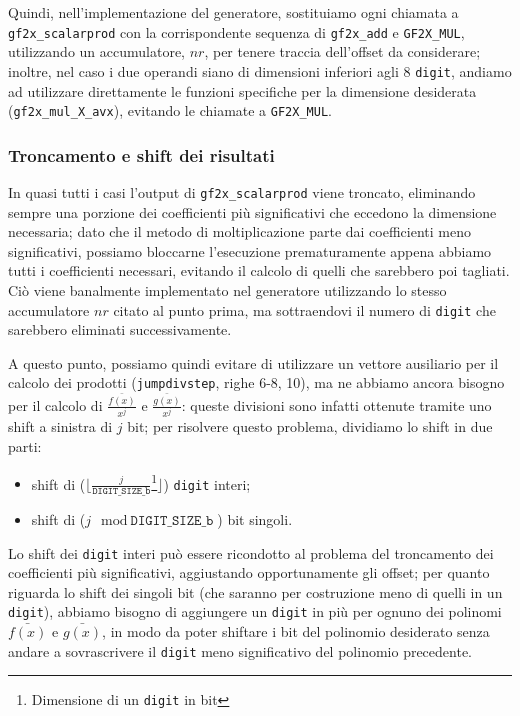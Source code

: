 Quindi, nell'implementazione del generatore, sostituiamo ogni chiamata a \texttt{gf2x\_scalarprod} con la corrispondente sequenza di \texttt{gf2x\_add} e \texttt{GF2X\_MUL},
utilizzando un accumulatore, $nr$, per tenere traccia dell'offset da considerare;
inoltre, nel caso i due operandi siano di dimensioni inferiori agli 8 \texttt{digit}, andiamo ad utilizzare direttamente le funzioni specifiche per la dimensione
desiderata (\texttt{gf2x\_mul\_X\_avx}), evitando le chiamate a \texttt{GF2X\_MUL}.

\subsubsection*{Troncamento e shift dei risultati}
In quasi tutti i casi l'output di \texttt{gf2x\_scalarprod} viene troncato, eliminando sempre una porzione dei coefficienti più significativi che eccedono la dimensione necessaria; dato che il
metodo di moltiplicazione parte dai coefficienti meno significativi, possiamo bloccarne l'esecuzione prematuramente appena abbiamo tutti i coefficienti
necessari, evitando il calcolo di quelli che sarebbero poi tagliati. Ciò viene banalmente implementato  nel generatore utilizzando lo stesso accumulatore
$nr$ citato al punto prima, ma sottraendovi il numero di \texttt{digit} che sarebbero eliminati successivamente. 

A questo punto, possiamo quindi evitare di utilizzare un vettore ausiliario per il calcolo dei prodotti (\texttt{jumpdivstep}, righe 6-8, 10), ma ne abbiamo ancora bisogno
per il calcolo di $\frac{\bar{f(x)}}{x^{j}}$ e $\frac{\bar{g(x)}}{x^{j}}$: queste divisioni sono infatti ottenute tramite uno shift a sinistra di $j$ bit; per risolvere
questo problema, dividiamo lo shift in due parti:
\begin{itemize}
    \item shift di ($\lfloor\frac{j}{\texttt{DIGIT\_SIZE\_b}}$\footnote{Dimensione di un \texttt{digit} in bit}$\rfloor$) \texttt{digit} interi;
    \item shift di ($j \mod \texttt{DIGIT\_SIZE\_b}$) bit singoli.
\end{itemize}
Lo shift dei \texttt{digit} interi può essere ricondotto al problema del troncamento dei coefficienti più significativi, aggiustando opportunamente gli offset; per quanto riguarda
lo shift dei singoli bit (che saranno per costruzione meno di quelli in un \texttt{digit}), abbiamo bisogno di aggiungere un \texttt{digit} in più per ognuno dei polinomi
$\bar{f(x)}$ e $\bar{g(x)}$, in modo da poter shiftare i bit del polinomio desiderato senza andare a sovrascrivere il \texttt{digit} meno significativo del polinomio precedente.

